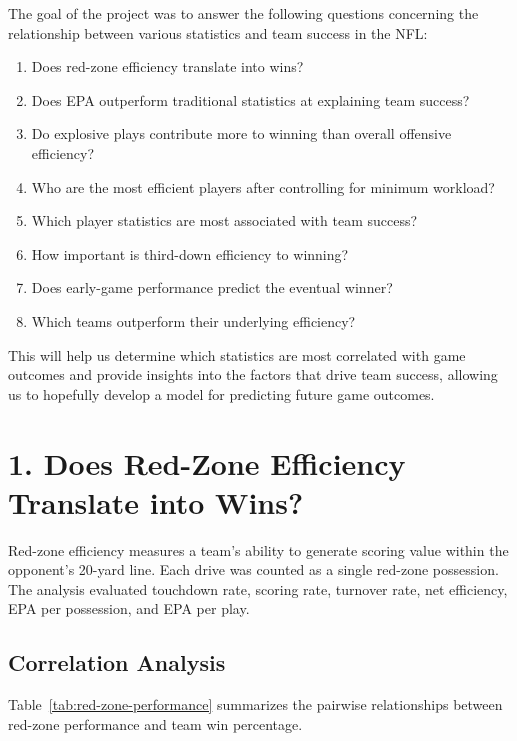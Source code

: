\documentclass[11pt]{article}
\begin{document}
The goal of the project was to answer the following questions concerning the relationship between various statistics and team success in the NFL:
\begin{enumerate}
    \item Does red-zone efficiency translate into wins?
    \item Does EPA outperform traditional statistics at explaining team success?
    \item Do explosive plays contribute more to winning than overall offensive efficiency?
    \item Who are the most efficient players after controlling for minimum workload?
    \item Which player statistics are most associated with team success?
    \item How important is third-down efficiency to winning?
    \item Does early-game performance predict the eventual winner?
    \item Which teams outperform their underlying efficiency?
\end{enumerate}
This will help us determine which statistics are most correlated with game outcomes and provide insights into the factors that drive team success, allowing us to hopefully develop a model for predicting future game outcomes.



\section*{1. Does Red-Zone Efficiency Translate into Wins?}

Red-zone efficiency measures a team's ability to generate scoring value within the opponent's 20-yard line. Each drive was counted as a single red-zone possession. The analysis evaluated touchdown rate, scoring rate, turnover rate, net efficiency, EPA per possession, and EPA per play.

\subsection*{Correlation Analysis}

Table~\ref{tab:red-zone-performance} summarizes the pairwise relationships between red-zone performance and team win percentage.
\end{document}
